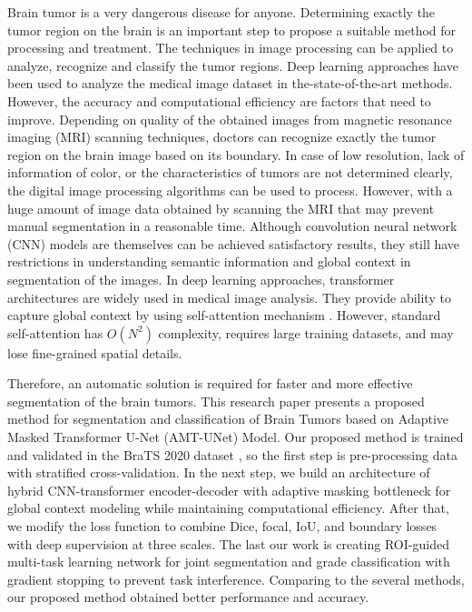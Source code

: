 \documentclass[runningheads]{llncs}
\begin{document}
Brain tumor is a very dangerous disease for anyone. Determining exactly the tumor region on the brain is an important step to propose a suitable method for processing and treatment. The techniques in image processing can be applied to analyze, recognize and classify the tumor regions. Deep learning approaches have been used to analyze the medical image dataset in the-state-of-the-art methods. However, the accuracy and computational efficiency are factors that need to improve. Depending on quality of the obtained images from magnetic resonance imaging (MRI) scanning techniques, doctors can recognize exactly the tumor region on the brain image based on its boundary. In case of low resolution, lack of information of color, or the characteristics of tumors are not determined clearly, the digital image processing algorithms can be used to process. However, with a huge amount of image data obtained by scanning the MRI that may prevent manual segmentation in a reasonable time. Although convolution neural network (CNN) models are themselves can be achieved satisfactory results, they still have restrictions in understanding semantic information and global context in segmentation of the images. In deep learning approaches, transformer architectures are widely used in medical image analysis. They provide ability to capture global context by using self-attention mechanism \cite{dosovitskiy2020image,chen2021transunet}. However, standard self-attention has $O(N^2)$ complexity, requires large training datasets, and may lose fine-grained spatial details.

Therefore, an automatic solution is required for faster and more effective segmentation of the brain tumors. This research paper presents a proposed method for segmentation and classification of Brain Tumors based on Adaptive Masked Transformer U-Net (AMT-UNet) Model. Our proposed method is trained and validated in the BraTS 2020 dataset \cite{menze2015brats,bakas2018brats}, so the first step is pre-processing data with stratified cross-validation. In the next step, we build an architecture of hybrid CNN-transformer encoder-decoder with adaptive masking bottleneck for global context modeling while maintaining computational efficiency. After that, we modify the loss function to combine Dice, focal, IoU, and boundary losses with deep supervision at three scales. The last our work is creating ROI-guided multi-task learning network for joint segmentation and grade classification with gradient stopping to prevent task interference. Comparing to the several methods, our proposed method obtained better performance and accuracy.
\end{document}
